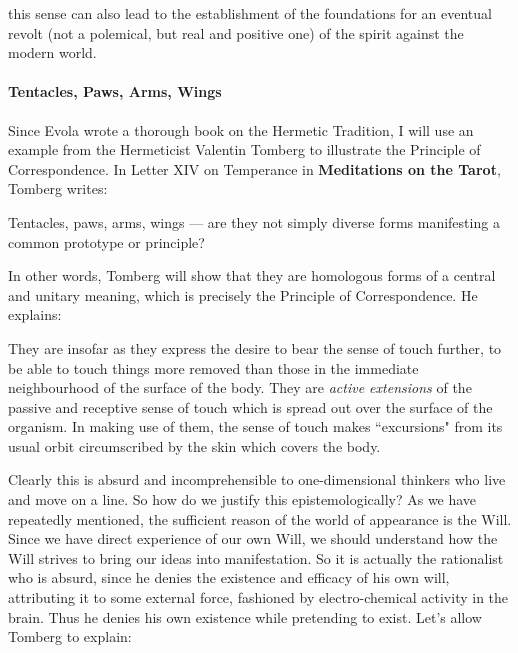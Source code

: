 \begin{quotex}
this sense can also lead to the establishment of the foundations for an eventual revolt (not a polemical, but real and positive one) of the spirit against the modern world. 

\end{quotex}

\paragraph{Tentacles, Paws, Arms, Wings}

Since Evola wrote a thorough book on the Hermetic Tradition, I will use an example from the Hermeticist Valentin Tomberg to illustrate the Principle of Correspondence. In Letter XIV on Temperance in \textbf{Meditations on the Tarot}, Tomberg writes: 

\begin{quotex}
Tentacles, paws, arms, wings — are they not simply diverse forms manifesting a common prototype or principle? 

\end{quotex}
In other words, Tomberg will show that they are homologous forms of a central and unitary meaning, which is precisely the Principle of Correspondence. He explains: 

\begin{quotex}
They are insofar as they express the desire to bear the sense of touch further, to be able to touch things more removed than those in the immediate neighbourhood of the surface of the body. They are \emph{active extensions} of the passive and receptive sense of touch which is spread out over the surface of the organism. In making use of them, the sense of touch makes ``excursions" from its usual orbit circumscribed by the skin which covers the body. 

\end{quotex}
Clearly this is absurd and incomprehensible to one-dimensional thinkers who live and move on a line. So how do we justify this epistemologically? As we have repeatedly mentioned, the sufficient reason of the world of appearance is the Will. Since we have direct experience of our own Will, we should understand how the Will strives to bring our ideas into manifestation. So it is actually the rationalist who is absurd, since he denies the existence and efficacy of his own will, attributing it to some external force, fashioned by electro-chemical activity in the brain. Thus he denies his own existence while pretending to exist. Let's allow Tomberg to explain:

